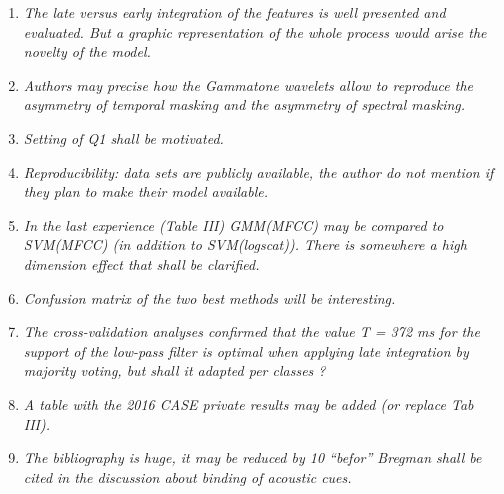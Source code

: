 \documentclass[10pt]{article}
\begin{document}
\begin{enumerate}

\item \emph{The late versus early integration of the features is well presented and evaluated. But a graphic representation of the whole process would arise the novelty of the model.}

\item \emph{Authors may precise  how the Gammatone wavelets allow
to reproduce the asymmetry of temporal masking and the asymmetry of spectral masking.}

\item \emph{Setting of Q1 shall be motivated.}

\item \emph{Reproducibility:  data sets are publicly available, the author do not mention if they plan to make their model available.}

\item \emph{In the last experience (Table III) GMM(MFCC) may be compared to SVM(MFCC) (in addition to SVM(logscat)). There is somewhere a high dimension effect that shall be clarified.}

\item \emph{Confusion matrix of the two best methods will be interesting.}

\item \emph{The cross-validation analyses confirmed that the value T = 372 ms for the support of the low-pass filter is optimal when applying late integration by majority voting, but shall it adapted per classes  ?}

\item \emph{A table with the 2016 CASE private results may be added (or replace Tab III).}

\item \emph{The bibliography is huge, it may be reduced by 10 %
“befor”
Bregman shall be cited in the discussion about  binding of acoustic cues.}

\end{enumerate}
\end{document}
